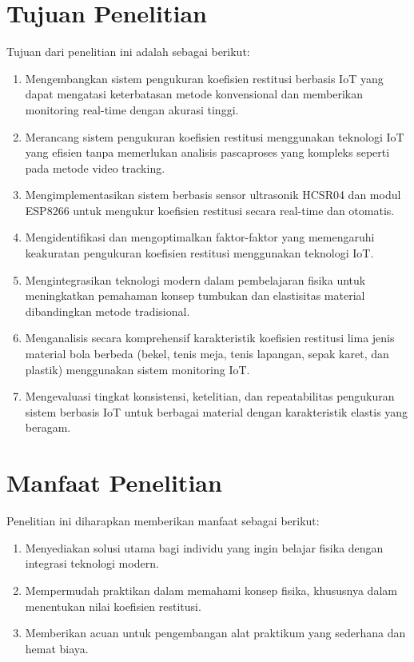 \section{Tujuan Penelitian}
 Tujuan dari penelitian ini adalah sebagai berikut:
\begin{enumerate}
\item Mengembangkan sistem pengukuran koefisien restitusi berbasis IoT yang dapat mengatasi keterbatasan metode konvensional dan memberikan monitoring real-time dengan akurasi tinggi.
\item Merancang sistem pengukuran koefisien restitusi menggunakan teknologi IoT yang efisien tanpa memerlukan analisis pascaproses yang kompleks seperti pada metode video tracking.
\item Mengimplementasikan sistem berbasis sensor ultrasonik HCSR04 dan modul ESP8266 untuk mengukur koefisien restitusi secara real-time dan otomatis.
\item Mengidentifikasi dan mengoptimalkan faktor-faktor yang memengaruhi keakuratan pengukuran koefisien restitusi menggunakan teknologi IoT.
\item Mengintegrasikan teknologi modern dalam pembelajaran fisika untuk meningkatkan pemahaman konsep tumbukan dan elastisitas material dibandingkan metode tradisional.
\item Menganalisis secara komprehensif karakteristik koefisien restitusi lima jenis material bola berbeda (bekel, tenis meja, tenis lapangan, sepak karet, dan plastik) menggunakan sistem monitoring IoT.
\item Mengevaluasi tingkat konsistensi, ketelitian, dan repeatabilitas pengukuran sistem berbasis IoT untuk berbagai material dengan karakteristik elastis yang beragam.
\end{enumerate}

\section{Manfaat Penelitian}
 Penelitian ini diharapkan memberikan manfaat sebagai berikut:
\begin{enumerate}
\item Menyediakan solusi utama bagi individu yang ingin belajar fisika dengan integrasi teknologi modern.
\item Mempermudah praktikan dalam memahami konsep fisika, khususnya dalam menentukan nilai koefisien restitusi.
\item Memberikan acuan untuk pengembangan alat praktikum yang sederhana dan hemat biaya.
\end{enumerate}


